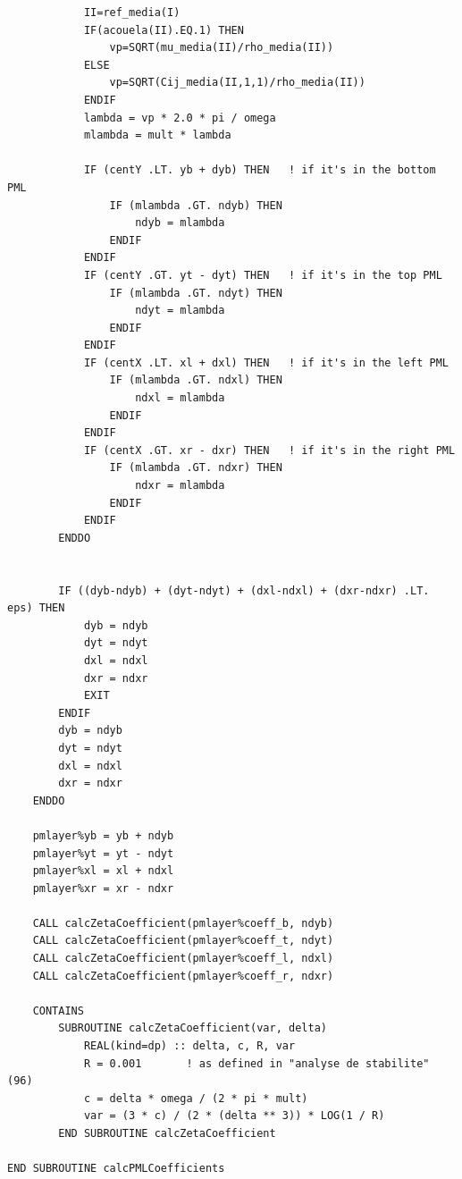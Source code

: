 \begin{lstlisting}
            II=ref_media(I)
            IF(acouela(II).EQ.1) THEN
                vp=SQRT(mu_media(II)/rho_media(II))
            ELSE
                vp=SQRT(Cij_media(II,1,1)/rho_media(II))
            ENDIF
            lambda = vp * 2.0 * pi / omega
            mlambda = mult * lambda

            IF (centY .LT. yb + dyb) THEN   ! if it's in the bottom PML
                IF (mlambda .GT. ndyb) THEN
                    ndyb = mlambda
                ENDIF
            ENDIF
            IF (centY .GT. yt - dyt) THEN   ! if it's in the top PML
                IF (mlambda .GT. ndyt) THEN
                    ndyt = mlambda
                ENDIF
            ENDIF
            IF (centX .LT. xl + dxl) THEN   ! if it's in the left PML
                IF (mlambda .GT. ndxl) THEN
                    ndxl = mlambda
                ENDIF
            ENDIF
            IF (centX .GT. xr - dxr) THEN   ! if it's in the right PML
                IF (mlambda .GT. ndxr) THEN
                    ndxr = mlambda
                ENDIF
            ENDIF
        ENDDO
		

        IF ((dyb-ndyb) + (dyt-ndyt) + (dxl-ndxl) + (dxr-ndxr) .LT. eps) THEN
            dyb = ndyb
            dyt = ndyt
            dxl = ndxl
            dxr = ndxr
            EXIT		
        ENDIF
        dyb = ndyb
        dyt = ndyt
        dxl = ndxl
        dxr = ndxr
    ENDDO

    pmlayer%yb = yb + ndyb
    pmlayer%yt = yt - ndyt
    pmlayer%xl = xl + ndxl
    pmlayer%xr = xr - ndxr

    CALL calcZetaCoefficient(pmlayer%coeff_b, ndyb)
    CALL calcZetaCoefficient(pmlayer%coeff_t, ndyt)
    CALL calcZetaCoefficient(pmlayer%coeff_l, ndxl)
    CALL calcZetaCoefficient(pmlayer%coeff_r, ndxr)
	
    CONTAINS
        SUBROUTINE calcZetaCoefficient(var, delta)
            REAL(kind=dp) :: delta, c, R, var
            R = 0.001       ! as defined in "analyse de stabilite" (96)
            c = delta * omega / (2 * pi * mult)
            var = (3 * c) / (2 * (delta ** 3)) * LOG(1 / R)
        END SUBROUTINE calcZetaCoefficient

END SUBROUTINE calcPMLCoefficients
\end{lstlisting}

